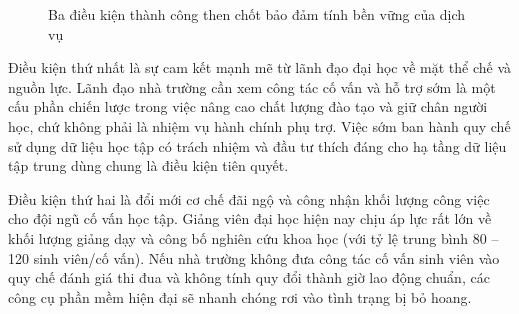 \begin{figure}[htbp]
\centering
{}
\caption{Ba điều kiện thành công then chốt bảo đảm tính bền vững của dịch vụ}
\label{fig:success_factors}
\end{figure}

Điều kiện thứ nhất là sự cam kết mạnh mẽ từ lãnh đạo đại học về mặt thể chế và nguồn lực. Lãnh đạo nhà trường cần xem công tác cố vấn và hỗ trợ sớm là một cấu phần chiến lược trong việc nâng cao chất lượng đào tạo và giữ chân người học, chứ không phải là nhiệm vụ hành chính phụ trợ. Việc sớm ban hành quy chế sử dụng dữ liệu học tập có trách nhiệm và đầu tư thích đáng cho hạ tầng dữ liệu tập trung dùng chung là điều kiện tiên quyết.

Điều kiện thứ hai là đổi mới cơ chế đãi ngộ và công nhận khối lượng công việc cho đội ngũ cố vấn học tập. Giảng viên đại học hiện nay chịu áp lực rất lớn về khối lượng giảng dạy và công bố nghiên cứu khoa học (với tỷ lệ trung bình 80 -- 120 sinh viên/cố vấn). Nếu nhà trường không đưa công tác cố vấn sinh viên vào quy chế đánh giá thi đua và không tính quy đổi thành giờ lao động chuẩn, các công cụ phần mềm hiện đại sẽ nhanh chóng rơi vào tình trạng bị bỏ hoang.

